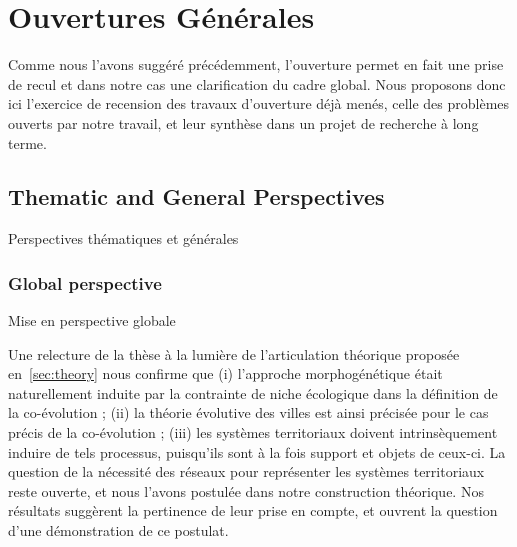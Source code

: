 


\chapter*{Ouvertures Générales}

\label{ch:opening}




Comme nous l'avons suggéré précédemment, l'ouverture permet en fait une prise de recul et dans notre cas une clarification du cadre global. Nous proposons donc ici l'exercice de recension des travaux d'ouverture déjà menés, celle des problèmes ouverts par notre travail, et leur synthèse dans un projet de recherche à long terme.


\section*{Thematic and General Perspectives}{Perspectives thématiques et générales}



\subsection*{Global perspective}{Mise en perspective globale}



Une relecture de la thèse à la lumière de l'articulation théorique proposée en~\ref{sec:theory} nous confirme que (i) l'approche morphogénétique était naturellement induite par la contrainte de niche écologique dans la définition de la co-évolution ; (ii) la théorie évolutive des villes est ainsi précisée pour le cas précis de la co-évolution ; (iii) les systèmes territoriaux doivent intrinsèquement induire de tels processus, puisqu'ils sont à la fois support et objets de ceux-ci. La question de la nécessité des réseaux pour représenter les systèmes territoriaux reste ouverte, et nous l'avons postulée dans notre construction théorique. Nos résultats suggèrent la pertinence de leur prise en compte, et ouvrent la question d'une démonstration de ce postulat.



